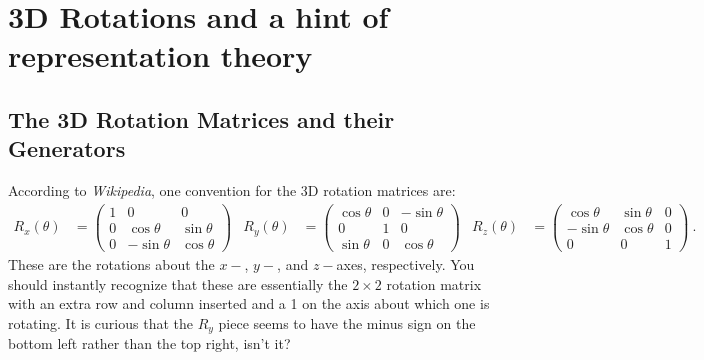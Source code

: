 \documentclass[12pt]{article}
\numberwithin{equation}{section}    %
\begin{document}


\section{3D Rotations and a hint of representation theory}

\subsection{The 3D Rotation Matrices and their Generators}
According to \emph{Wikipedia}, one convention for the 3D rotation matrices are:
\begin{align*}
	R_x(\theta) &= 
	\begin{pmatrix}
		1 & 0 & 0 \\
		0 & \cos\theta & \sin\theta\\
		0 & -\sin\theta & \cos\theta
	\end{pmatrix}
	&
	R_y(\theta) &=
	\begin{pmatrix}
		\cos \theta & 0 & -\sin\theta \\
		0 & 1 & 0 \\
		\sin\theta & 0 & \cos\theta
	\end{pmatrix}
	&
	R_z(\theta) &=
	\begin{pmatrix}
		\cos\theta & \sin\theta & 0 \\
		-\sin\theta & \cos\theta & 0 \\
		0 & 0 & 1
	\end{pmatrix} \ .
\end{align*}
These are the rotations about the $x-$, $y-$, and $z-$axes, respectively.
You should instantly recognize that these are essentially the $2\times 2$ rotation matrix with an extra row and column inserted and a 1 on the axis about which one is rotating. It is curious that the $R_y$ piece seems to have the minus sign on the bottom left rather than the top right, isn't it?
\end{document}
